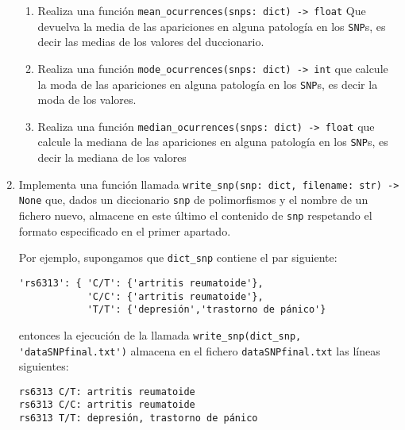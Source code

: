 \documentclass[a4paper,10pt]{article}
\begin{document}
\begin{enumerate}
\begin{enumerate}
  \item Realiza una función
    \lstinline|mean_ocurrences(snps: dict) -> float|
    Que devuelva la media de las apariciones en alguna patología en
    los \lstinline{SNP}s, es decir las medias de los valores del duccionario.
  \item Realiza una función
    \lstinline|mode_ocurrences(snps: dict) -> int|
    que calcule la moda de las apariciones en alguna patología en
    los \lstinline{SNP}s, es decir la moda de los valores.
  \item Realiza una función
    \lstinline|median_ocurrences(snps: dict) -> float|
    que calcule la mediana de las apariciones en alguna patología en
    los \lstinline{SNP}s, es decir la mediana de los valores
    \end{enumerate}

   \item Implementa una función llamada
     \lstinline{write_snp(snp: dict, filename: str) -> None}
     que, dados un diccionario \lstinline{snp} de polimorfismos y
     el nombre de un fichero nuevo,
     almacene en este último el contenido de \lstinline{snp} respetando el formato especificado en el primer apartado.

     Por ejemplo, supongamos que \lstinline{dict_snp} contiene el par siguiente: \\
\begin{lstlisting}
'rs6313': { 'C/T': {'artritis reumatoide'},
            'C/C': {'artritis reumatoide'},
            'T/T': {'depresión','trastorno de pánico'}
\end{lstlisting}
entonces la ejecución de la llamada \lstinline{write_snp(dict_snp, 'dataSNPfinal.txt')} almacena en el fichero \lstinline{dataSNPfinal.txt} las líneas siguientes:  \\
\begin{lstlisting}
rs6313 C/T: artritis reumatoide
rs6313 C/C: artritis reumatoide
rs6313 T/T: depresión, trastorno de pánico
\end{lstlisting}
\end{enumerate}
%
\noindent
\end{document}
